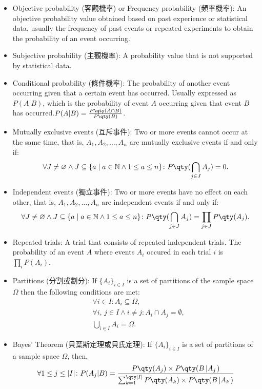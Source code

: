 \documentclass[a4paper,12pt]{report}
\begin{document}
\begin{itemize}
\item Objective probability (客觀機率) or Frequency probability (頻率機率): An objective probability value obtained based on past experience or statistical data, usually the frequency of past events or repeated experiments to obtain the probability of an event occurring.
\item Subjective probability (主觀機率): A probability value that is not supported by statistical data.
\item Conditional probability (條件機率): The probability of another event occurring given that a certain event has occurred. Usually expressed as $P(A|B)$, which is the probability of event $A$ occurring given that event $B$ has occurred.$P(A|B)= \frac{P\qty(A\cap B)}{P\qty(B)}$.
\item Mutually exclusive events (互斥事件): Two or more events cannot occur at the same time, that is, $A_1,A_2,\ldots,A_n$ are mutually exclusive events if and only if:
\[\forall J\neq\varnothing\land J\subseteq\{a\mid a\in\mathbb{N}\land 1\leq a\leq n\}\colon P\qty(\bigcap_{j\in J} A_j)=0.\]
\item Independent events (獨立事件): Two or more events have no effect on each other, that is, $A_1,A_2,\ldots,A_n$ are independent events if and only if:
\[\forall J\neq\varnothing\land J\subseteq\{a\mid a\in\mathbb{N}\land 1\leq a\leq n\}\colon P\qty(\bigcap_{j\in J} A_j)=\prod_{j\in J}P\qty(A_j).\]
\item Repeated trials: A trial that consists of repeated independent trials. The probability of an event $A$ where events $A_i$ occured in each trial $i$ is $\prod_iP(A_i)$.
\item Partitions (分割或劃分): If \( \{A_i\}_{i \in I} \) is a set of partitions of the sample space \( \Omega \) then the following conditions are met:
\[\begin{aligned}
& \forall i \in I\colon A_i \subseteq \Omega,\\
& \forall i,\, j \in I \land i\neq j\colon A_i \cap A_j = \emptyset,\\
& \bigcup_{i \in I} A_i = \Omega. 
\end{aligned}\]
\item Bayes' Theorem (貝葉斯定理或貝氏定理): If \( \{A_i\}_{i \in I} \) is a set of partitions of a sample space \( \Omega \), then,
\[ \forall 1\leq j\leq |I|\colon P(A_j|B)= \frac{P\qty(A_j)\times P\qty(B\left| A_j\right.)}{\sum_{k=1}^{\qty|I|} P\qty(A_k)\times P\qty(B\left| A_k\right.)} \]
\end{itemize}
\end{document}
